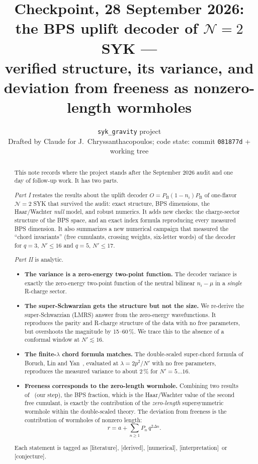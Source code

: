\documentclass[11pt]{article}
\title{\bf Checkpoint, 28 September 2026:\\ the BPS uplift decoder of $\mathcal N{=}2$ SYK ---\\
verified structure, its variance, and\\ deviation from freeness as nonzero-length wormholes}
\author{\texttt{syk\_gravity} project \\[2pt] \small Drafted by Claude for J.~Chryssanthacopoulos; code state: commit \texttt{081877d} + working tree}
\date{}
\newcommand{\PB}{P_{\mathrm B}}
\newcommand{\Np}{N'}
\newcommand{\tagbox}[2]{\textsf{\small\color{#1}[#2]}}
\newcommand{\EST}{\tagbox{cest}{literature}}
\newcommand{\DER}{\tagbox{cder}{derived}}
\newcommand{\NUM}{\tagbox{cnum}{numerical}}
\newcommand{\CONJ}{\tagbox{cconj}{conjecture}}
\newcommand{\INTERP}{\tagbox{cconj}{interpretation}}
\theoremstyle{remark}
\begin{document}
\maketitle

\begin{abstract}
\noindent
This note records where the project stands after the September 2026 audit and one day of follow-up work. It has
two parts.

\emph{Part I} restates the results about the uplift decoder $O=\PB(1-n_i)\PB$ of one-flavor $\mathcal N{=}2$ SYK
that survived the audit: exact structure, BPS dimensions, the Haar/Wachter \emph{null} model, and robust numerics. It
adds new checks: the charge-sector structure of the BPS space, and an exact index formula reproducing every
measured BPS dimension. It also summarizes a new numerical campaign that measured the ``chord invariants''
(free cumulants, crossing weights, six-letter words) of the decoder for $q=3$, $\Np\le16$ and $q=5$, $\Np\le17$.

\emph{Part II} is analytic.
\begin{itemize}\itemsep1pt
\item \textbf{The variance is a zero-energy two-point function.} The decoder variance is exactly the zero-energy
  two-point function of the neutral bilinear $n_i-\mu$ in a \emph{single} R-charge sector.
\item \textbf{The super-Schwarzian gets the structure but not the size.} We re-derive the super-Schwarzian
  (LMRS) answer from the zero-energy wavefunctions. It reproduces the parity and R-charge structure of the data
  with no free parameters, but overshoots the magnitude by 15--60\,\%. We trace this to the absence of a
  conformal window at $\Np\lesssim16$.
\item \textbf{The finite-$\lambda$ chord formula matches.} The double-scaled super-chord formula of Boruch, Lin
  and Yan~\cite{BLY}, evaluated at $\lambda=2p^2/\Np$ with no free parameters, reproduces the measured variance
  to about 2\,\% for $\Np=5\ldots16$.
\item \textbf{Freeness corresponds to the zero-length wormhole.} Combining two results of~\cite{BLY} (our
  step), the BPS fraction, which is the Haar/Wachter value of the second free cumulant, is exactly the
  contribution of the \emph{zero-length} supersymmetric wormhole within the double-scaled theory. The deviation
  from freeness is the contribution of wormholes of nonzero length:
  \[
  r=a+\sum_{n\ge1}P_n\,q^{2\Delta n}.
  \]
\end{itemize}
Each statement is tagged as \EST, \DER, \NUM, \INTERP\ or \CONJ.
\end{abstract}
\end{document}
